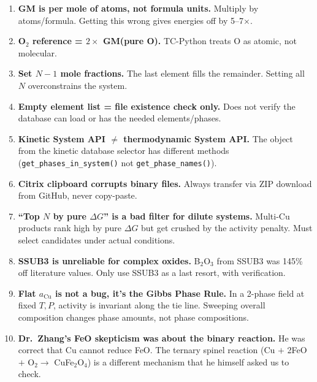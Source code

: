 \documentclass[11pt]{article}
\begin{document}
\begin{enumerate}[leftmargin=*]
    \item \textbf{GM is per mole of atoms, not formula units.} Multiply by atoms/formula. Getting this wrong gives energies off by 5--7$\times$.

    \item \textbf{O$_2$ reference = $2 \times$ GM(pure O).} TC-Python treats O as atomic, not molecular.

    \item \textbf{Set $N-1$ mole fractions.} The last element fills the remainder. Setting all $N$ overconstrains the system.

    \item \textbf{Empty element list = file existence check only.} Does not verify the database can load or has the needed elements/phases.

    \item \textbf{Kinetic System API $\neq$ thermodynamic System API.} The object from the kinetic database selector has different methods (\texttt{get\_phases\_in\_system()} not \texttt{get\_phase\_names()}).

    \item \textbf{Citrix clipboard corrupts binary files.} Always transfer via ZIP download from GitHub, never copy-paste.

    \item \textbf{``Top $N$ by pure $\Delta G$'' is a bad filter for dilute systems.} Multi-Cu products rank high by pure $\Delta G$ but get crushed by the activity penalty. Must select candidates under actual conditions.

    \item \textbf{SSUB3 is unreliable for complex oxides.} B$_2$O$_3$ from SSUB3 was 145\% off literature values. Only use SSUB3 as a last resort, with verification.

    \item \textbf{Flat $a_{\text{Cu}}$ is not a bug, it's the Gibbs Phase Rule.} In a 2-phase field at fixed $T, P$, activity is invariant along the tie line. Sweeping overall composition changes phase amounts, not phase compositions.

    \item \textbf{Dr.\ Zhang's FeO skepticism was about the binary reaction.} He was correct that Cu cannot reduce FeO. The ternary spinel reaction (Cu $+$ 2FeO $+$ O$_2 \to$ CuFe$_2$O$_4$) is a different mechanism that he himself asked us to check.
\end{enumerate}
\end{document}

